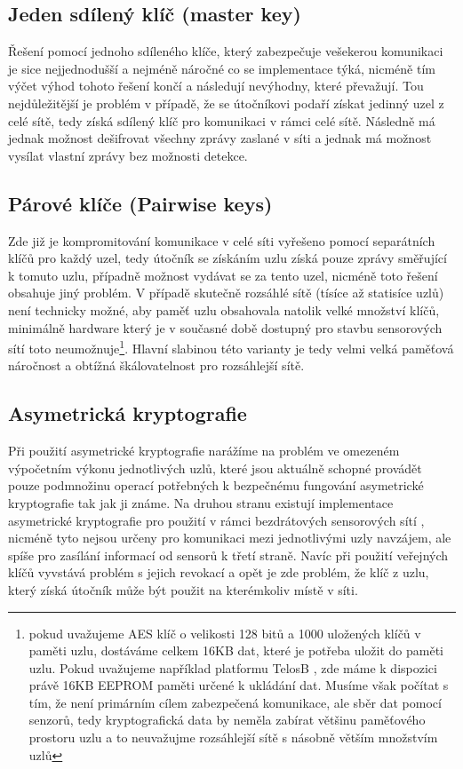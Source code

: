 \documentclass[11pt,final,twoside]{fithesis2}
\begin{document}
\subsection{Jeden sdílený klíč (master key)} Řešení pomocí jednoho sdíleného klíče, který zabezpečuje vešekerou komunikaci je sice nejjednodušší a 
nejméně náročné co se implementace týká, nicméně tím výčet výhod tohoto řešení končí a následují nevýhodny, které převažují. Tou nejdůležitější 
je problém v případě, že se útočníkovi podaří získat jedinný uzel z celé sítě, tedy získá sdílený klíč pro komunikaci v rámci celé sítě. Následně 
má jednak možnost dešifrovat všechny zprávy zaslané v síti a jednak má možnost vysílat vlastní zprávy bez možnosti detekce.

\subsection{Párové klíče (Pairwise keys)} Zde již je kompromitování komunikace v celé síti vyřešeno pomocí separátních klíčů pro každý uzel, 
tedy útočník se získáním uzlu získá pouze zprávy směřující k tomuto uzlu, případně možnost vydávat se za tento uzel, nicméně toto řešení 
obsahuje jiný problém. V případě skutečně rozsáhlé sítě (tísíce až statisíce uzlů) není technicky možné, aby paměť uzlu obsahovala natolik 
velké množství klíčů, minimálně hardware který je v současné době dostupný pro stavbu sensorových sítí toto neumožnuje\footnote{pokud uvažujeme 
AES \cite{Daemen1999} klíč o velikosti 128 bitů a 1000 uložených klíčů v paměti uzlu, dostáváme celkem 16KB dat, které je potřeba uložit do paměti uzlu. 
Pokud uvažujeme například platformu TelosB \cite{MemsicInc.}, zde máme k dispozici právě 16KB EEPROM paměti určené k ukládání dat. Musíme však počítat s 
tím, že není primárním cílem zabezpečená komunikace, ale sběr dat pomocí senzorů, tedy kryptografická data by neměla zabírat většinu paměťového prostoru 
uzlu a to neuvažujme rozsáhlejší sítě s násobně větším množstvím uzlů}. Hlavní slabinou této varianty je tedy velmi velká paměťová náročnost a obtížná 
škálovatelnost pro rozsáhlejší sítě. 

\subsection{Asymetrická kryptografie} Při použití asymetrické kryptografie narážíme na problém ve omezeném výpočetním výkonu jednotlivých uzlů, 
které jsou aktuálně schopné provádět pouze podmnožinu operací potřebných k bezpečnému fungování asymetrické kryptografie tak jak ji známe.
Na druhou stranu existují implementace asymetrické kryptografie pro použití v rámci bezdrátových sensorových sítí \cite{Watro2004}, nicméně 
tyto nejsou určeny pro komunikaci mezi jednotlivými uzly navzájem, ale spíše pro zasílání informací od sensorů k třetí straně. 
Navíc při použití veřejných klíčů vyvstává problém s jejich revokací a opět je zde problém, že klíč z uzlu, který získá útočník může být použit 
na kterémkoliv místě v síti.
\end{document}
